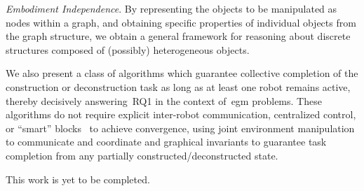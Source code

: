 \emph{Embodiment Independence}. By representing the objects to be manipulated as
nodes within a graph, and obtaining specific properties of individual objects
from the graph structure, we obtain a general framework for reasoning about
discrete structures composed of (possibly) heterogeneous objects.

We also present a class of algorithms which guarantee collective completion of
the construction or deconstruction task as long as at least one robot remains
active, thereby decisively answering~\gls{RQ1} in the context of~\gls{egm}
problems. These algorithms do not require explicit inter-robot communication,
centralized control, or ``smart'' blocks~\cite{Werfel2006} to achieve
convergence, using joint environment manipulation to communicate and coordinate
and graphical invariants to guarantee task completion from any partially
constructed/deconstructed state.

This work is yet to be completed.


